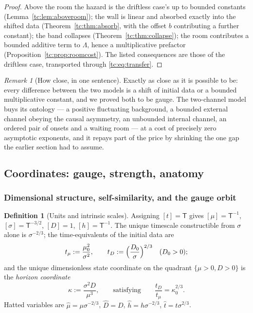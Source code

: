 \documentclass[11pt]{article}
\numberwithin{equation}{section}
\theoremstyle{plain}
\theoremstyle{definition}
\newtheorem{definition}[theorem]{Definition}
\theoremstyle{remark}
\newtheorem{remark}[theorem]{Remark}
\begin{document}
\begin{proof}
Above the room the hazard is the driftless case's up to bounded constants
(Lemma~\ref{tc:lem:aboveroom}); the wall is linear and absorbed exactly
into the shifted data (Theorem~\ref{tc:thm:absorb}, with the offset $b$
contributing a further constant); the band collapses
(Theorem~\ref{tc:thm:collapse}); the room contributes a bounded additive
term to $\Lambda$, hence a multiplicative prefactor
(Proposition~\ref{tc:prop:roomcost}). The listed consequences are those
of the driftless case, transported through
\eqref{tc:eq:transfer}.
\end{proof}

\begin{remark}[How close, in one sentence]\label{tc:rem:howclose}
Exactly as close as it is possible to be: every difference between the
two models is a shift of initial data or a bounded multiplicative
constant, and we proved both to be gauge. The two-channel model
buys its ontology --- a positive fluctuating background, a bounded
external channel obeying the causal asymmetry, an unbounded internal
channel, an ordered pair of onsets and a waiting room --- at a cost of
precisely zero asymptotic exponents, and it repays part of the price by
shrinking the one gap the earlier section had to assume.
\end{remark}

\subsection{Coordinates: gauge, strength, anatomy}\label{gr1:sub:coords}\label{tc:sub:polar}

\subsubsection{Dimensional structure, self-similarity, and the gauge orbit}
\label{sh:subsub:dimensional}

\begin{definition}[Units and intrinsic scales]\label{sh:def:units}
Assigning $[t]=\mathsf T$ gives $[\mu]=\mathsf T^{-1}$,
$[\sigma]=\mathsf T^{-3/2}$, $[D]=1$, $[h]=\mathsf T^{-1}$. The unique
timescale constructible from $\sigma$ alone is $\sigma^{-2/3}$; the
time-equivalents of the initial data are
\begin{equation}\label{sh:eq:timescales}
t_\mu:=\frac{\mu_0^2}{\sigma^2},\qquad
t_D:=\Bigl(\frac{D_0}{\sigma}\Bigr)^{2/3}\quad(D_0>0);
\end{equation}
and the unique dimensionless state coordinate on the quadrant
$\{\mu>0,D>0\}$ is the \emph{horizon coordinate}
\begin{equation}\label{sh:eq:kappa}
\kappa:=\frac{\sigma^2D}{\mu^3},\qquad\text{satisfying}\qquad
\frac{t_D}{t_\mu}=\kappa_0^{2/3}.
\end{equation}
Hatted variables are $\hat\mu=\mu\sigma^{-2/3}$, $\hat D=D$,
$\hat h=h\sigma^{-2/3}$, $\hat t=t\sigma^{2/3}$.
\end{definition}
\end{document}
